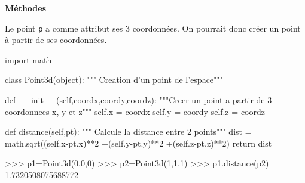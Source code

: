 \documentclass[10pt,fleqn]{article} %
\begin{document}
\begin{defi}
\textbf{Méthodes}


\end{defi}


\begin{exemple}

Le point \texttt{p} a comme attribut ses 3 coordonnées. On pourrait donc créer un point à partir de ses coordonnées.

\begin{minipage}[c]{.9\linewidth}
\begin{py}
\begin{python}
import math

class Point3d(object):
    """ Creation d'un point de l'espace"""

    def __init__(self,coordx,coordy,coordz):
        """Creer un point a partir de 3 coordonnees x, y et z"""
        self.x = coordx
        self.y = coordy
        self.z = coordz

    def distance(self,pt):
        """ Calcule la distance entre 2 points"""
        dist = math.sqrt((self.x-pt.x)**2
                         +(self.y-pt.y)**2
                         +(self.z-pt.z)**2)
        return dist
    
>>> p1=Point3d(0,0,0)
>>> p2=Point3d(1,1,1)
>>> p1.distance(p2)
	1.7320508075688772
\end{python}
\end{py}
\end{minipage}
\end{exemple}

\begin{thebibliography}{2}
\end{thebibliography}
\end{document}
